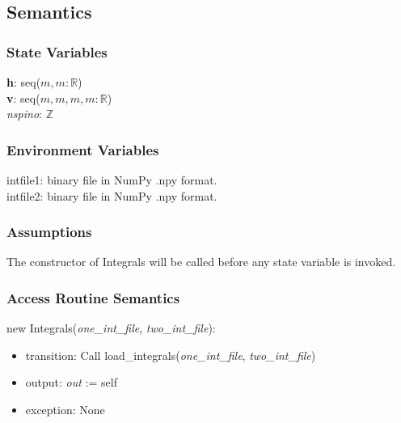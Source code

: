 \documentclass[12pt, titlepage]{article}
\begin{document}
\subsection{Semantics}

\subsubsection{State Variables}

\textbf{h}: seq($m,m:\mathbb{R}$)\\
\textbf{v}: seq($m,m,m,m:\mathbb{R}$)\\
\textit{nspino}: $\mathbb{Z}$

\subsubsection{Environment Variables}

intfile1: binary file in NumPy .npy format.\\
intfile2: binary file in NumPy .npy format.

\subsubsection{Assumptions}

The constructor of Integrals will be called before any state variable is 
invoked.

\subsubsection{Access Routine Semantics}

\noindent new Integrals(\textit{one\_int\_file}, \textit{two\_int\_file}):
\begin{itemize}
	\item transition: Call load\_integrals(\textit{one\_int\_file}, 
	\textit{two\_int\_file})
	\item output: \textit{out} := self 
	\item exception: None 
\end{itemize}
\end{document}
